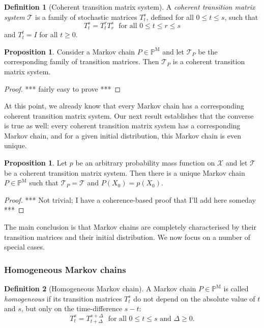\documentclass[10pt]{paper}
\theoremstyle{definition}
\newtheorem{proposition}[theorem]{Proposition}
\newtheorem{definition}{Definition}
\newcommand{\states}{\mathcal{X}}
\newcommand{\processes}{\mathbb{P}}
\newcommand{\mprocesses}{\processes^{\mathrm{M}}}
\begin{document}
\begin{definition}[Coherent transition matrix system]
A \emph{coherent transition matrix system} $\mathcal{T}$ is a family of stochastic matrices $T_t^s$, defined for all $0\leq t\leq s$, such that
\begin{equation}\label{eq:transmatrixproduct}
T_t^s=T_t^r T_r^s
\text{~~for all $0\leq t\leq r\leq s$}
\end{equation}
and $T_t^t=I$ for all $t\geq0$.
\end{definition}

\begin{proposition}
Consider a Markov chain $P\in\mprocesses$ and let $\mathcal{T}_P$ be the corresponding family of transition matrices. Then $\mathcal{T}_P$ is a coherent transition matrix system.
\end{proposition}
\begin{proof}
*** fairly easy to prove ***
\end{proof}

At this point, we already know that every Markov chain has a corresponding coherent transition matrix system. Our next result establishes that the converse is true as well: every coherent transition matrix system has a corresponding Markov chain, and for a given initial distribution, this Markov chain is even unique.

\begin{proposition}
 Let $p$ be an arbitrary probability mass function on $\states$ and let $\mathcal{T}$ be a coherent transition matrix system. Then there is a unique Markov chain $P\in\mprocesses$ such that $\mathcal{T}_P=\mathcal{T}$ and $P(X_0)=p(X_0)$.
\end{proposition}
\begin{proof}
*** Not trivial; I have a coherence-based proof that I'll add here someday ***
\end{proof}

The main conclusion is that Markov chains are completely characterised by their transition matrices and their initial distribution. We now focus on a number of special cases.

\subsubsection{Homogeneous Markov chains}

\begin{definition}[Homogeneous Markov chain]\label{def:markov_property}
A Markov chain $P\in\mprocesses$ is called \emph{homogeneous} if its transition matrices $T_t^s$ do not depend on the absolute value of $t$ and $s$, but only on the time-difference $s-t$:
\begin{equation*}
T_t^s=T_{t+\Delta}^{s+\Delta}
\text{~~for all $0\leq t\leq s$ and $\Delta\geq0$.}
\end{equation*}
\end{definition}
\end{document}
